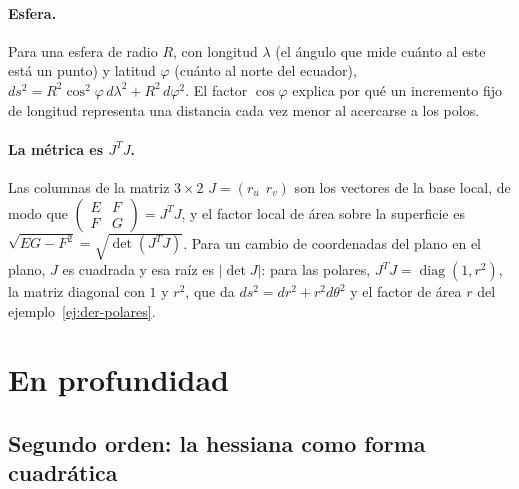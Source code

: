 \paragraph{Esfera.} Para una esfera de radio \(R\), con longitud \(\lambda\) (el ángulo que
mide cuánto al este está un punto) y latitud \(\varphi\) (cuánto al norte del ecuador),
\(ds^2=R^2\cos^2\varphi\,d\lambda^2+R^2\,d\varphi^2\). El factor \(\cos\varphi\) explica por qué
un incremento fijo de longitud representa una distancia cada vez menor al acercarse a los polos.

\paragraph{La métrica es \(J^TJ\).} Las columnas de la matriz \(3\times2\)
\(J=(r_u\ \ r_v)\) son los vectores de la base local, de modo que
\(\left(\begin{smallmatrix}E&F\\F&G\end{smallmatrix}\right)=J^TJ\), y el factor local de área sobre la superficie es \(\sqrt{EG-F^2}=\sqrt{\det(J^TJ)}\). Para un
cambio de coordenadas del plano en el plano, \(J\) es cuadrada y esa raíz es
\(\lvert\det J\rvert\): para las polares, \(J^TJ=\operatorname{diag}(1,r^2)\), la matriz
diagonal con \(1\) y \(r^2\), que da
\(ds^2=dr^2+r^2d\theta^2\) y el factor de área \(r\) del ejemplo~\ref{ej:der-polares}.


\section{En profundidad}

\subsection{Segundo orden: la hessiana como forma cuadrática}\label{sec:hessiana}

